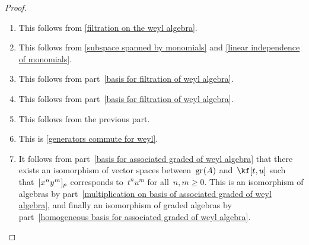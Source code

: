 \begin{proof}
  \leavevmode
  \begin{enumerate}
    \item
      This follows from \cref{filtration on the weyl algebra}.
    \item
      This follows from \cref{subspace spanned by monomials} and \cref{linear independence of monomials}.
    \item
      This follows from part~\ref{basis for filtration of weyl algebra}.
    \item
      This follows from part~\ref{basis for filtration of weyl algebra}.
    \item
      This follows from the previous part.
    \item
      This is \cref{generators commute for weyl}. 
    \item
      It follows from part~\ref{basis for associated graded of weyl algebra} that there exists an isomorphism of vector spaces between~$\gr(A)$ and~$\kf[t,u]$ such that~$\lbrack x^n y^m \rbrack_p$ corresponds to~$t^n u^m$ for all~$n, m \geq 0$.
      This is an isomorphism of algebras by part~\ref{multiplication on basis of associated graded of weyl algebra}, and finally an isomorphism of graded algebras by part~\ref{homogeneous basis for associated graded of weyl algebra}.
    \qedhere
  \end{enumerate}
\end{proof}


